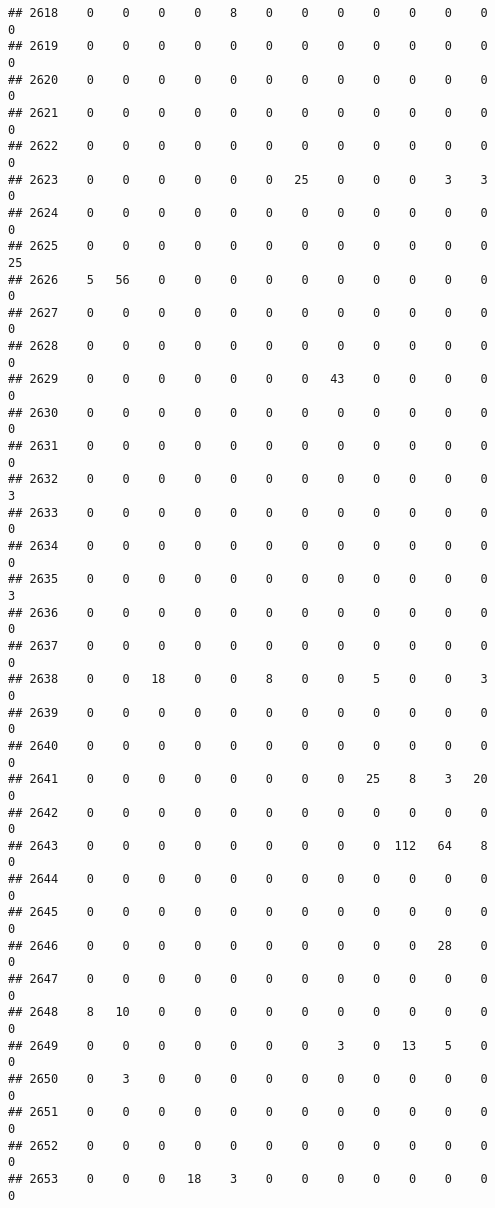 \documentclass[]{article}
\begin{document}
\begin{verbatim}
## 2618    0    0    0    0    8    0    0    0    0    0    0    0    0
## 2619    0    0    0    0    0    0    0    0    0    0    0    0    0
## 2620    0    0    0    0    0    0    0    0    0    0    0    0    0
## 2621    0    0    0    0    0    0    0    0    0    0    0    0    0
## 2622    0    0    0    0    0    0    0    0    0    0    0    0    0
## 2623    0    0    0    0    0    0   25    0    0    0    3    3    0
## 2624    0    0    0    0    0    0    0    0    0    0    0    0    0
## 2625    0    0    0    0    0    0    0    0    0    0    0    0   25
## 2626    5   56    0    0    0    0    0    0    0    0    0    0    0
## 2627    0    0    0    0    0    0    0    0    0    0    0    0    0
## 2628    0    0    0    0    0    0    0    0    0    0    0    0    0
## 2629    0    0    0    0    0    0    0   43    0    0    0    0    0
## 2630    0    0    0    0    0    0    0    0    0    0    0    0    0
## 2631    0    0    0    0    0    0    0    0    0    0    0    0    0
## 2632    0    0    0    0    0    0    0    0    0    0    0    0    3
## 2633    0    0    0    0    0    0    0    0    0    0    0    0    0
## 2634    0    0    0    0    0    0    0    0    0    0    0    0    0
## 2635    0    0    0    0    0    0    0    0    0    0    0    0    3
## 2636    0    0    0    0    0    0    0    0    0    0    0    0    0
## 2637    0    0    0    0    0    0    0    0    0    0    0    0    0
## 2638    0    0   18    0    0    8    0    0    5    0    0    3    0
## 2639    0    0    0    0    0    0    0    0    0    0    0    0    0
## 2640    0    0    0    0    0    0    0    0    0    0    0    0    0
## 2641    0    0    0    0    0    0    0    0   25    8    3   20    0
## 2642    0    0    0    0    0    0    0    0    0    0    0    0    0
## 2643    0    0    0    0    0    0    0    0    0  112   64    8    0
## 2644    0    0    0    0    0    0    0    0    0    0    0    0    0
## 2645    0    0    0    0    0    0    0    0    0    0    0    0    0
## 2646    0    0    0    0    0    0    0    0    0    0   28    0    0
## 2647    0    0    0    0    0    0    0    0    0    0    0    0    0
## 2648    8   10    0    0    0    0    0    0    0    0    0    0    0
## 2649    0    0    0    0    0    0    0    3    0   13    5    0    0
## 2650    0    3    0    0    0    0    0    0    0    0    0    0    0
## 2651    0    0    0    0    0    0    0    0    0    0    0    0    0
## 2652    0    0    0    0    0    0    0    0    0    0    0    0    0
## 2653    0    0    0   18    3    0    0    0    0    0    0    0    0

\end{verbatim}
\end{document}

